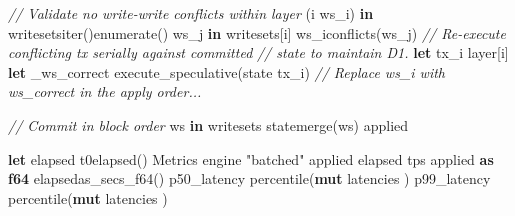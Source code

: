 \documentclass[11pt,a4paper]{article}
\providecommand{\NormalTok}[1]{#1}
\providecommand{\KeywordTok}[1]{\textbf{#1}}
\providecommand{\DataTypeTok}[1]{\textbf{#1}}
\providecommand{\CommentTok}[1]{\textit{#1}}
\providecommand{\StringTok}[1]{#1}
\newenvironment{Shaded}{}{}
\newenvironment{Highlighting}[1][]{\par\noindent\begin{minipage}{\linewidth}\ttfamily\small}{\end{minipage}\par}
\begin{document}
\begin{Shaded}
\begin{Highlighting}[]
            \CommentTok{// Validate no write{-}write conflicts within layer}
            \NormalTok{ (i}\OperatorTok{,}\NormalTok{ ws\_i) }\KeywordTok{in}\NormalTok{ writesets}\NormalTok{iter()}\NormalTok{enumerate() }\OperatorTok{\{}
                \NormalTok{ ws\_j }\KeywordTok{in} \OperatorTok{\&}\NormalTok{writesets[}\NormalTok{i] }\OperatorTok{\{}
                    \NormalTok{ ws\_i}\NormalTok{conflicts(ws\_j) }\OperatorTok{\{}
                        \CommentTok{// Re{-}execute conflicting tx serially against committed}
                        \CommentTok{// state to maintain D1.}
                        \KeywordTok{let}\NormalTok{ tx\_i }\OperatorTok{=}\NormalTok{ layer[i]}\OperatorTok{;}
                        \KeywordTok{let}\NormalTok{ \_ws\_correct }\OperatorTok{=}\NormalTok{ execute\_speculative(state}\OperatorTok{,}\NormalTok{ tx\_i)}\OperatorTok{;}
                        \CommentTok{// Replace ws\_i with ws\_correct in the apply order...}
                    \OperatorTok{\}}
                \OperatorTok{\}}
            \OperatorTok{\}}

            \CommentTok{// Commit in block order}
            \NormalTok{ ws }\KeywordTok{in}\NormalTok{ writesets }\OperatorTok{\{}
\NormalTok{                state}\NormalTok{merge(ws)}\OperatorTok{;}
\NormalTok{                applied }\OperatorTok{+=} \OperatorTok{;}
            \OperatorTok{\}}
        \OperatorTok{\}}
    \OperatorTok{\}}

    \KeywordTok{let}\NormalTok{ elapsed }\OperatorTok{=}\NormalTok{ t0}\NormalTok{elapsed()}\OperatorTok{;}
\NormalTok{    Metrics }\OperatorTok{\{}
\NormalTok{        engine}\OperatorTok{:} \StringTok{"batched"}\OperatorTok{,}
\NormalTok{        applied}\OperatorTok{,}
\NormalTok{        elapsed}\OperatorTok{,}
\NormalTok{        tps}\OperatorTok{:}\NormalTok{ applied }\KeywordTok{as} \DataTypeTok{f64} \OperatorTok{/}\NormalTok{ elapsed}\NormalTok{as\_secs\_f64()}\OperatorTok{,}
\NormalTok{        p50\_latency}\OperatorTok{:}\NormalTok{ percentile(}\OperatorTok{\&}\KeywordTok{mut}\NormalTok{ latencies}\OperatorTok{,} \NormalTok{)}\OperatorTok{,}
\NormalTok{        p99\_latency}\OperatorTok{:}\NormalTok{ percentile(}\OperatorTok{\&}\KeywordTok{mut}\NormalTok{ latencies}\OperatorTok{,} \NormalTok{)}\OperatorTok{,}
    \OperatorTok{\}}
\OperatorTok{\}}
\end{Highlighting}
\end{Shaded}
\end{document}

